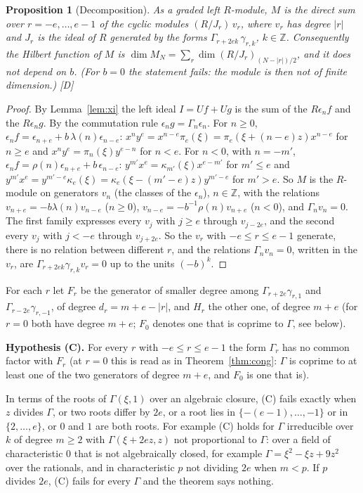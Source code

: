 \documentclass[11pt]{article}
\newtheorem{proposition}{Proposition}
\theoremstyle{definition}
\theoremstyle{remark}
\begin{document}
\begin{proposition}[Decomposition]\label{prop:decomp}
As a graded left $R$-module, $M$ is the direct sum over $r=-e,\dots,e-1$ of the cyclic modules $(R/J_r)\,v_r$, where $v_r$ has degree $|r|$ and $J_r$ is the ideal of $R$ generated by the forms $\Gamma_{r+2ek}\,\gamma_{r,k}$, $k\in\mathbb Z$. Consequently the Hilbert function of $M$ is $\dim M_N=\sum_r\dim(R/J_r)_{(N-|r|)/2}$, and it does not depend on $b$. (For $b=0$ the statement fails: the module is then not of finite dimension.) [D]
\end{proposition}
\begin{proof}
By Lemma~\ref{lem:xi} the left ideal $I=Uf+Ug$ is the sum of the $R\epsilon_nf$ and the $R\epsilon_ng$. By the commutation rule $\epsilon_ng=\Gamma_n\epsilon_n$. For $n\ge0$, $\epsilon_nf=\epsilon_{n+e}+b\,\lambda(n)\epsilon_{n-e}$: $x^ny^e=x^{n-e}\pi_e(\xi)=\pi_e(\xi+(n-e)z)x^{n-e}$ for $n\ge e$ and $x^ny^e=\pi_n(\xi)y^{e-n}$ for $n<e$. For $n<0$, with $n=-m'$, $\epsilon_nf=\rho(n)\epsilon_{n+e}+b\,\epsilon_{n-e}$: $y^{m'}x^e=\kappa_{m'}(\xi)x^{e-m'}$ for $m'\le e$ and $y^{m'}x^e=y^{m'-e}\kappa_e(\xi)=\kappa_e(\xi-(m'-e)z)y^{m'-e}$ for $m'>e$. So $M$ is the $R$-module on generators $v_n$ (the classes of the $\epsilon_n$), $n\in\mathbb Z$, with the relations $v_{n+e}=-b\lambda(n)v_{n-e}$ ($n\ge0$), $v_{n-e}=-b^{-1}\rho(n)v_{n+e}$ ($n<0$), and $\Gamma_nv_n=0$. The first family expresses every $v_j$ with $j\ge e$ through $v_{j-2e}$, and the second every $v_j$ with $j<-e$ through $v_{j+2e}$. So the $v_r$ with $-e\le r\le e-1$ generate, there is no relation between different $r$, and the relations $\Gamma_nv_n=0$, written in the $v_r$, are $\Gamma_{r+2ek}\gamma_{r,k}v_r=0$ up to the units $(-b)^k$.
\end{proof}

For each $r$ let $F_r$ be the generator of smaller degree among $\Gamma_{r+2e}\gamma_{r,1}$ and $\Gamma_{r-2e}\gamma_{r,-1}$, of degree $d_r=m+e-|r|$, and $H_r$ the other one, of degree $m+e$ (for $r=0$ both have degree $m+e$; $F_0$ denotes one that is coprime to $\Gamma$, see below).

\noindent\textbf{Hypothesis (C).} For every $r$ with $-e\le r\le e-1$ the form $\Gamma_r$ has no common factor with $F_r$ (at $r=0$ this is read as in Theorem~\ref{thm:cong}: $\Gamma$ is coprime to at least one of the two generators of degree $m+e$, and $F_0$ is one that is).

In terms of the roots of $\Gamma(\xi,1)$ over an algebraic closure, (C) fails exactly when $z$ divides $\Gamma$, or two roots differ by $2e$, or a root lies in $\{-(e-1),\dots,-1\}$ or in $\{2,\dots,e\}$, or $0$ and $1$ are both roots. For example (C) holds for $\Gamma$ irreducible over $k$ of degree $m\ge2$ with $\Gamma(\xi+2ez,z)$ not proportional to $\Gamma$: over a field of characteristic $0$ that is not algebraically closed, for example $\Gamma=\xi^2-\xi z+9z^2$ over the rationals, and in characteristic $p$ not dividing $2e$ when $m<p$. If $p$ divides $2e$, (C) fails for every $\Gamma$ and the theorem says nothing.
\end{document}
